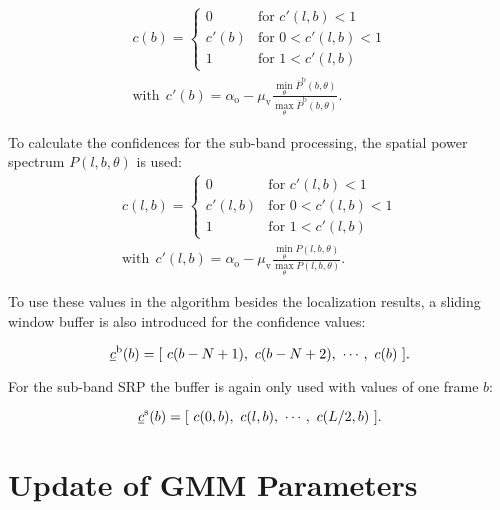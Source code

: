 \begin{equation}
\begin{split}
	c(b)=
	\begin{cases}
	     0 		  	& \text{for } c'(l,b) < 1 \\
	     c'(b)  	& \text{for } 0 < c'(l,b) < 1 \\
	     1		  	& \text{for } 1 < c'(l,b)
	\end{cases}\\[1em]
\text{with}\ \ c'(b) = \alpha_\text{o}-\mu_\text{v}\frac{\min_\theta \overline P^\text{b}(b,\theta) }{\max_\theta \overline{P}^\text{b}(b,\theta)}.
\label{eq:conf_calc_broad}
\end{split}
\end{equation}

To calculate the confidences for the sub-band processing, the spatial power spectrum $P(l,b,\theta)$ is used:
\begin{equation}
\begin{split}
	c(l,b)=
	\begin{cases}
	     0 		  	& \text{for } c'(l,b) < 1 \\
	     c'(l,b)  	& \text{for } 0 < c'(l,b) < 1 \\
	     1		  	& \text{for } 1 < c'(l,b)
	\end{cases}\\[1em]
\text{with}\ \ c'(l,b) = \alpha_\text{o}-\mu_\text{v}\frac{\min_\theta P(l,b,\theta) }{\max_\theta P(l,b,\theta)}.
\label{eq:conf_calc_sub}
\end{split}
\end{equation}

To use these values in the algorithm besides the localization results, a sliding window buffer is also introduced for the confidence values:

\begin{equation}
\vect c^\text{b}(b) = [\ c(b-N+1),\ c(b-N+2),\ \cdots,\ c(b) \ ].
\label{conf_buffer_broad}
\end{equation}

For the sub-band \ac{SRP} the buffer is again only used with values of one frame $b$:

\begin{equation}
\vect c^\text{s}(b) = [\ c(0,b),\ c(l,b),\ \cdots,\ c(L/2,b) \ ].
\label{conf_buffer_sub}
\end{equation}

\section{Update of GMM Parameters}
\label{sec:update}

